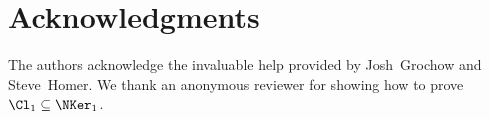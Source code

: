 \section{Acknowledgments}

The authors acknowledge the invaluable help provided by Josh~Grochow and Steve~Homer.
We thank an anonymous reviewer for showing how to prove $\Cl_1 \subseteq \NKer_1$.
